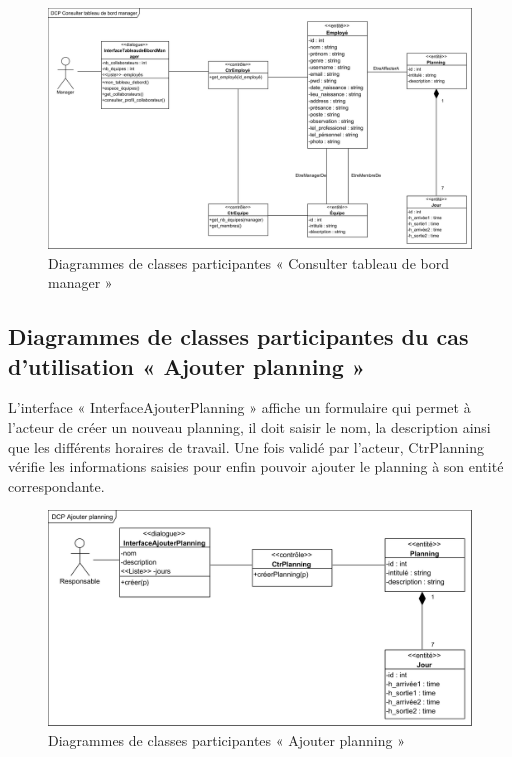             \begin{figure}[h!]
                 \centering
                \includegraphics[scale=0.68,angle=90]{images/DCP/DCP Consulter tableau de bord manager.png}
                 \caption{Diagrammes de classes participantes « Consulter tableau de bord manager »}
                 \label{fig27}
            \end{figure}
        \clearpage
       
        \subsection*{Diagrammes de classes participantes du cas d'utilisation « Ajouter planning »}
           L’interface « InterfaceAjouterPlanning » affiche un formulaire qui permet à l’acteur de créer un nouveau planning, il doit saisir le nom, la description ainsi que les différents horaires de travail.
           Une fois validé par l’acteur, CtrPlanning vérifie les informations saisies pour enfin pouvoir ajouter le planning à son entité correspondante.
            \begin{figure}[h!]
                 \centering
                \includegraphics[scale=0.88]{images/DCP/DCP Ajouter planning.png}
                 \caption{Diagrammes de classes participantes « Ajouter planning »}
                 \label{fig28}
            \end{figure}
        
